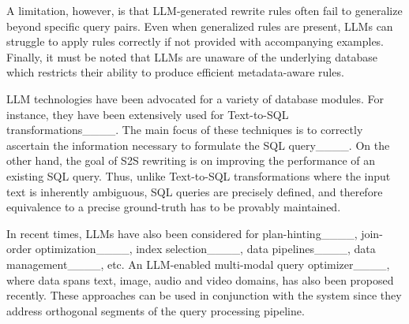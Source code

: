 A limitation, however, is that LLM-generated rewrite rules often fail to generalize beyond specific query pairs. Even when generalized rules are present,  LLMs can struggle to apply rules correctly if not provided with accompanying examples. Finally, it must be noted that LLMs are unaware of the underlying database which restricts their ability to produce efficient metadata-aware rules. 

LLM technologies have been advocated for a variety of database modules. For instance, they have been extensively used for Text-to-SQL transformations____.
The main focus of these techniques is to correctly ascertain the information necessary to formulate the SQL query____.
On the other hand, the goal of S2S rewriting is on improving the performance of an existing SQL query.  Thus, unlike Text-to-SQL transformations where the input text is inherently ambiguous, SQL queries are precisely defined, and therefore
equivalence to a precise ground-truth has to be provably maintained. 

In recent times, LLMs have also been considered for plan-hinting____, join-order optimization____, index selection____, data pipelines____, data management____, etc.  An LLM-enabled multi-modal query optimizer____, where data spans text, image, audio and video domains, has also been proposed recently. These approaches can be used in conjunction with the \lithe system since they address orthogonal segments of the query processing pipeline.